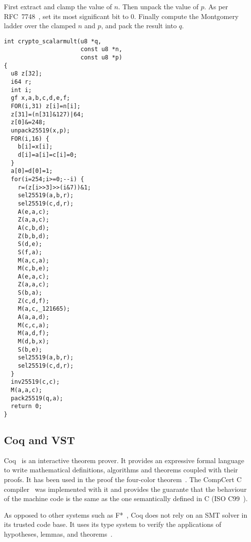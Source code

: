 First extract and clamp the value of $n$. Then unpack the value of $p$.
As per RFC~7748~\cite{rfc7748}, set its most significant bit to 0.
Finally compute the Montgomery ladder over the clamped $n$ and $p$,
and pack the result into $q$.
\begin{lstlisting}[language=Ctweetnacl]
int crypto_scalarmult(u8 *q,
                      const u8 *n,
                      const u8 *p)
{
  u8 z[32];
  i64 r;
  int i;
  gf x,a,b,c,d,e,f;
  FOR(i,31) z[i]=n[i];
  z[31]=(n[31]&127)|64;
  z[0]&=248;
  unpack25519(x,p);
  FOR(i,16) {
    b[i]=x[i];
    d[i]=a[i]=c[i]=0;
  }
  a[0]=d[0]=1;
  for(i=254;i>=0;--i) {
    r=(z[i>>3]>>(i&7))&1;
    sel25519(a,b,r);
    sel25519(c,d,r);
    A(e,a,c);
    Z(a,a,c);
    A(c,b,d);
    Z(b,b,d);
    S(d,e);
    S(f,a);
    M(a,c,a);
    M(c,b,e);
    A(e,a,c);
    Z(a,a,c);
    S(b,a);
    Z(c,d,f);
    M(a,c,_121665);
    A(a,a,d);
    M(c,c,a);
    M(a,d,f);
    M(d,b,x);
    S(b,e);
    sel25519(a,b,r);
    sel25519(c,d,r);
  }
  inv25519(c,c);
  M(a,a,c);
  pack25519(q,a);
  return 0;
}
\end{lstlisting}

\subsection{Coq and VST}
\label{preliminaries:C}

Coq~\cite{coq-faq} is an interactive theorem prover. It provides an expressive
formal language to write mathematical definitions, algorithms and theorems coupled
with their proofs. It has been used in the proof the four-color theorem~\cite{gonthier2008formal}.
The CompCert C compiler~\cite{Leroy-backend} was implemented with it and provides
the guarante that the behaviour of the machine code is the same as the one
semantically defined in C (ISO C99~\cite{ISO:C99}).

As opposed to other systems such as F*~\cite{DBLP:journals/corr/BhargavanDFHPRR17},
Coq does not rely on an SMT solver in its trusted code base.
It uses its type system to verify the applications of hypotheses,
lemmas, and theorems~\cite{Howard1995-HOWTFN}.

